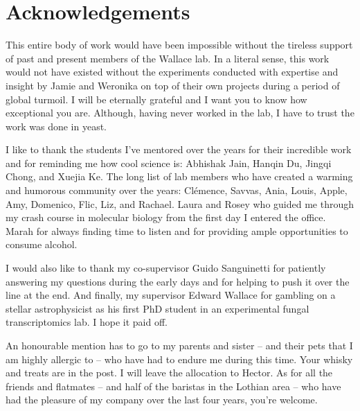 \documentclass[../main.tex]{subfiles}
\begin{document}
\chapter{Acknowledgements}
This entire body of work would have been impossible without the tireless support of past and present members of the Wallace lab.
In a literal sense, this work would not have existed without the experiments conducted with expertise and insight by Jamie and Weronika on top of their own projects during a period of global turmoil.
I will be eternally grateful and I want you to know how exceptional you are.
Although, having never worked in the lab, I have to trust the work was done in yeast. 

I like to thank the students I've mentored over the years for their incredible work and for reminding me how cool science is: Abhishak Jain, Hanqin Du, Jingqi Chong, and Xuejia Ke. 
The long list of lab members who have created a warming and humorous community over the years: Clémence, Savvas, Ania, Louis, Apple, Amy, Domenico, Flic, Liz, and Rachael.
Laura and Rosey who guided me through my crash course in molecular biology from the first day I entered the office.
Marah for always finding time to listen and for providing ample opportunities to consume alcohol.

I would also like to thank my co-supervisor Guido Sanguinetti for patiently answering my questions during the early days and for helping to push it over the line at the end.
And finally, my supervisor Edward Wallace for gambling on a stellar astrophysicist as his first PhD student in an experimental fungal transcriptomics lab. 
I hope it paid off. 

An honourable mention has to go to my parents and sister -- and their pets that I am highly allergic to -- who have had to endure me during this time.
Your whisky and treats are in the post. 
I will leave the allocation to Hector.
As for all the friends and flatmates -- and half of the baristas in the Lothian area -- who have had the pleasure of my company over the last four years, you're welcome.
\end{document}
